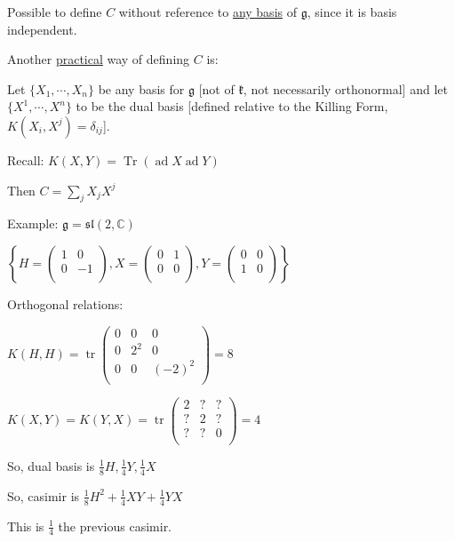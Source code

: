 \documentclass{article}
\theoremstyle{definition}
\newcommand{\ad}{\operatorname{ad}}
\newcommand{\Tr}{\operatorname{Tr}}
\begin{document}
Possible to define \(C\) without reference to \underline{any basis} of \(\mathfrak{g}\), since it is basis independent.

Another \underline{practical} way of defining \(C\) is:

Let \(\{ X_1,\cdots,X_n \} \) be any basis for \(\mathfrak{g}\) [not of \(\mathfrak{k}\), not necessarily orthonormal] and let \(\{ X^1,\cdots,X^n \} \) to be the dual basis [defined relative to the Killing Form, \(K(X_i,X^j)=\delta_{i j}\)].

Recall: \(K(X,Y)=\Tr(\ad X \ad Y)\) 

Then \(C = \sum_{j} X_j X^j\)

Example: \(\mathfrak{g} = \mathfrak{sl}(2,\mathbb{C})\) 

\(\left\{ H = \begin{pmatrix}
    1 &  0 \\
    0 &  -1 \\
\end{pmatrix}, X = \begin{pmatrix}
    0 &  1 \\
    0 &  0 \\
\end{pmatrix}, Y = \begin{pmatrix}
    0 &  0 \\
    1 &  0 \\
\end{pmatrix} \right\} \) 

Orthogonal relations:

\newcommand{\tr}{\operatorname{tr}}

\(K(H,H)=\tr \begin{pmatrix}
    0 & 0 &  0 \\
    0 & 2^2 &  0 \\
    0 & 0 &  (-2)^2 \\
\end{pmatrix}=8\) 

\(K(X,Y)=K(Y,X)=\tr \begin{pmatrix}
    2 & ? &  ? \\
    ? & 2 &  ? \\
    ? & ? &  0 \\
\end{pmatrix}=4\) 

So, dual basis is \(\frac{1}{8}H, \frac{1}{4}Y, \frac{1}{4}X\)

So, casimir is \(\frac{1}{8}H^2 + \frac{1}{4}XY + \frac{1}{4}YX \) 

This is \(\frac{1}{4}\) the previous casimir. 
\end{document}
